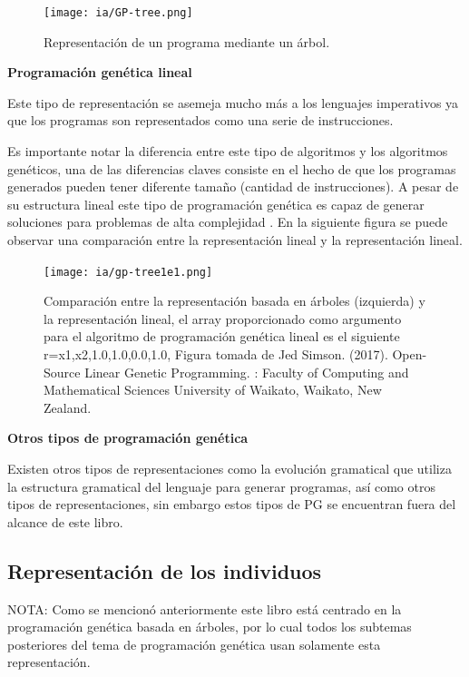\documentclass[11pt,fleqn]{book} %
\begin{document}
\begin{figure}[ht]
\centering\texttt{[image: ia/GP-tree.png]}
\caption{Representación de un programa mediante un árbol.}
\label{fig:GP-tree} 
\end{figure}

\textbf{Programación genética lineal}

Este tipo de representación se asemeja mucho más a los lenguajes imperativos ya que los programas son representados como una serie de instrucciones.

Es importante notar la diferencia entre este tipo de algoritmos y los algoritmos genéticos, una de las diferencias claves consiste en el hecho de que los programas generados pueden tener diferente tamaño (cantidad de instrucciones). A pesar de su estructura lineal este tipo de programación genética es capaz de generar soluciones para problemas de alta complejidad \cite{opensourceLGP}. En la siguiente figura se puede observar una comparación entre la representación lineal y la representación lineal.

\begin{figure}[ht]
\centering\texttt{[image: ia/gp-tree1e1.png]}
\caption{Comparación entre la representación basada en árboles (izquierda) y la representación lineal, el array proporcionado como argumento para el algoritmo de programación genética lineal es el siguiente r={x1,x2,1.0,1.0,0.0,1.0}, Figura tomada de Jed Simson. (2017). Open-Source Linear Genetic Programming. : Faculty of Computing and Mathematical Sciences University of Waikato, Waikato, New Zealand.\cite{opensourceLGP}}
\label{fig:gp-tree1e1} 
\end{figure}

\textbf{Otros tipos de programación genética}

Existen otros tipos de representaciones como la evolución gramatical que utiliza la estructura gramatical del lenguaje para generar programas, así como otros tipos de representaciones, sin embargo estos tipos de PG se encuentran fuera del alcance de este libro.

\subsection{Representación de los individuos}

NOTA: Como se mencionó anteriormente este libro está centrado en la programación genética basada en árboles, por lo cual todos los subtemas posteriores del tema de programación genética usan solamente esta representación.
\end{document}
